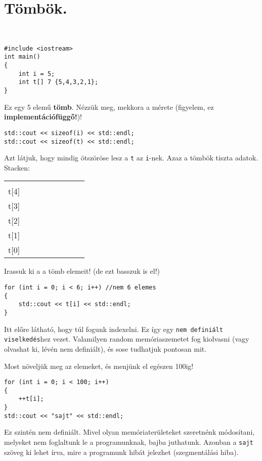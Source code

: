 \documentclass[a4paper,11.5pt]{article}
\begin{document}
	\section{Tömbök.}
	\begin{example}\ 
		
		\begin{lstlisting}
#include <iostream>
int main()
{
	int i = 5;
	int t[] 7 {5,4,3,2,1};
}
		\end{lstlisting}
		Ez egy 5 elemű \textbf{tömb}. Nézzük meg, mekkora a mérete (figyelem, ez \textbf{implementációfüggő!})!
		\begin{lstlisting}
std::cout << sizeof(i) << std::endl;
std::cout << sizeof(t) << std::endl;
		\end{lstlisting}
		Azt látjuk, hogy mindig ötszöröse lesz a \texttt{t} az \texttt{i}-nek. Azaz a tömbök tiszta adatok.  Stacken:
		\begin{center}
			\begin{tabular}{r|c|l}
				&&\\
				\cline{2-2}
				t[4]&&\\
				\cline{2-2}
				t[3]&~~~~~~~~~~~&\\
				\cline{2-2}
				t[2]&&\\
				\cline{2-2}
				t[1]&&\\
				\cline{2-2}
				t[0]&&\\
				\cline{2-2}
			\end{tabular}
		\end{center}
		Irassuk ki a a tömb elemeit! (de ezt basszuk is el!)
		\begin{lstlisting}
for (int i = 0; i < 6; i++) //nem 6 elemes
{
	std::cout << t[i] << std::endl;
}
		\end{lstlisting} 
		Itt előre látható, hogy túl fogunk indexelni. Ez így egy \texttt{nem definiált viselkedés}hez vezet. Valamilyen random memóriaszemetet fog kiolvasni (vagy olvashat ki, lévén nem definiált), és sose tudhatjuk pontosan mit.
		
		Most növeljük meg az elemeket, és menjünk el egészen 100ig!
		\begin{lstlisting}
for (int i = 0; i < 100; i++)
{
	++t[i];
}
std::cout << "sajt" << std::endl;
		\end{lstlisting} 
		Ez szintén nem definiált. Mivel olyan memóriaterületeket szeretnénk módosítani, melyeket nem foglaltunk le a programunknak, bajba juthatunk. Azonban a \texttt{sajt} szöveg ki lehet írva, mire a programunk hibát jelezhet (szegmentálási hiba).
		

\end{example}
\end{document}
